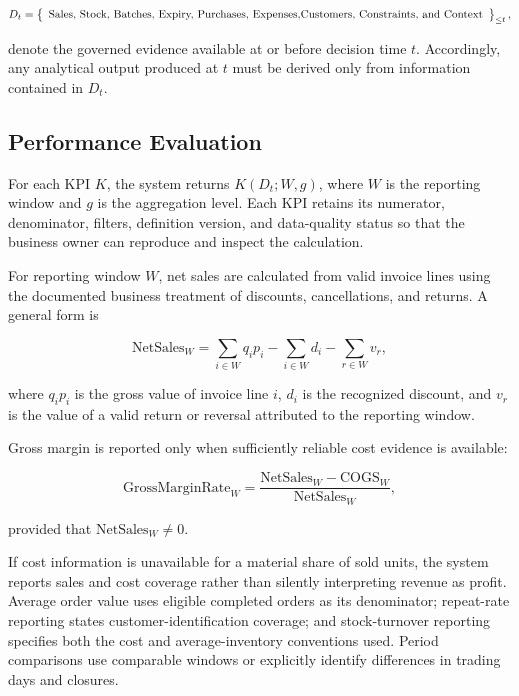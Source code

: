 \documentclass[a4paper,11pt,oneside]{book}
\theoremstyle{plain}
\theoremstyle{definition}
\theoremstyle{remark}
\let\\\space
\begin{document}
\begin{equation}
D_t=
\left\{
\begin{array}{c}
\text{Sales, Stock, Batches, Expiry, Purchases, Expenses,}\\
\text{Customers, Constraints, and Context}
\end{array}
\right\}_{\leq t},
\label{eq:data_cutoff}
\end{equation}

denote the governed evidence available at or before decision time \(t\).
Accordingly, any analytical output produced at \(t\) must be derived only from
information contained in \(D_t\).


\subsection{Performance Evaluation}
\label{subsec:performance_evaluation}

For each KPI \(K\), the system returns \(K(D_t;W,g)\), where \(W\) is the
reporting window and \(g\) is the aggregation level. Each KPI retains its
numerator, denominator, filters, definition version, and data-quality status so
that the business owner can reproduce and inspect the calculation.

For reporting window \(W\), net sales are calculated from valid invoice lines
using the documented business treatment of discounts, cancellations, and
returns. A general form is

\begin{equation}
\mathrm{NetSales}_{W}
=
\sum_{i\in W} q_i p_i
-
\sum_{i\in W} d_i
-
\sum_{r\in W} v_r,
\label{eq:netsales}
\end{equation}

where \(q_i p_i\) is the gross value of invoice line \(i\), \(d_i\) is the
recognized discount, and \(v_r\) is the value of a valid return or reversal
attributed to the reporting window.

Gross margin is reported only when sufficiently reliable cost evidence is
available:

\begin{equation}
\mathrm{GrossMarginRate}_{W}
=
\frac{
\mathrm{NetSales}_{W}-\mathrm{COGS}_{W}
}{
\mathrm{NetSales}_{W}
},
\label{eq:grossmargin}
\end{equation}

provided that \(\mathrm{NetSales}_{W}\neq 0\).

If cost information is unavailable for a material share of sold units, the
system reports sales and cost coverage rather than silently interpreting revenue
as profit. Average order value uses eligible completed orders as its
denominator; repeat-rate reporting states customer-identification coverage; and
stock-turnover reporting specifies both the cost and average-inventory
conventions used. Period comparisons use comparable windows or explicitly
identify differences in trading days and closures.
\end{document}
